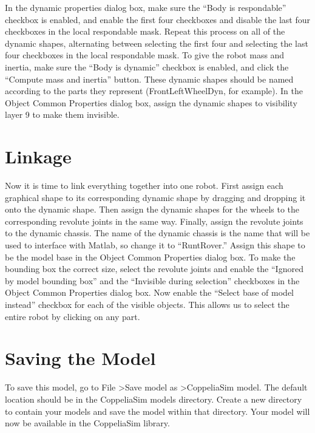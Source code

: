 In the dynamic properties dialog box, make sure the ``Body is respondable'' checkbox is enabled, and enable the first four checkboxes and disable the last four checkboxes in the local respondable mask. Repeat this process on all of the dynamic shapes, alternating between selecting the first four and selecting the last four checkboxes in the local respondable mask. To give the robot mass and inertia, make sure the ``Body is dynamic'' checkbox is enabled, and click the ``Compute mass and inertia'' button. These dynamic shapes should be named according to the parts they represent (FrontLeftWheelDyn, for example). In the Object Common Properties dialog box, assign the dynamic shapes to visibility layer 9 to make them invisible.

\section{Linkage}
Now it is time to link everything together into one robot. First assign each graphical shape to its corresponding dynamic shape by dragging and dropping it onto the dynamic shape. Then assign the dynamic shapes for the wheels to the corresponding revolute joints in the same way. Finally, assign the revolute joints to the dynamic chassis. The name of the dynamic chassis is the name that will be used to interface with Matlab, so change it to ``RuntRover.'' Assign this shape to be the model base in the Object Common Properties dialog box. To make the bounding box the correct size, select the revolute joints and enable the ``Ignored by model bounding box'' and the ``Invisible during selection'' checkboxes in the Object Common Properties dialog box. Now enable the ``Select base of model instead'' checkbox for each of the visible objects. This allows us to select the entire robot by clicking on any part.

\section{Saving the Model}
To save this model, go to File \textgreater Save model as \textgreater CoppeliaSim model. The default location should be in the CoppeliaSim models directory. Create a new directory to contain your models and save the model within that directory. Your model will now be available in the CoppeliaSim library.


